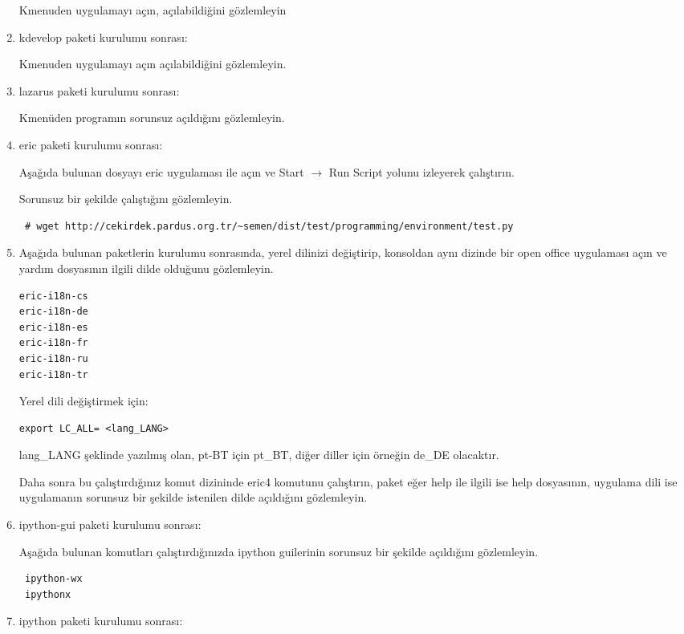 \documentclass[a4paper,10pt]{article}
\begin{document}
\begin{enumerate}
Kmenuden uygulamayı açın, açılabildiğini gözlemleyin

 \item kdevelop paketi kurulumu sonrası: 

Kmenuden uygulamayı açın açılabildiğini gözlemleyin.

 \item lazarus paketi kurulumu sonrası:

Kmenüden programın sorunsuz açıldığını gözlemleyin.

 \item eric paketi kurulumu sonrası:
 
Aşağıda bulunan dosyayı eric uygulaması ile açın ve Start $\rightarrow$ Run Script yolunu izleyerek çalıştırın. 

Sorunsuz bir şekilde çalıştığını gözlemleyin.
\begin{verbatim}
 # wget http://cekirdek.pardus.org.tr/~semen/dist/test/programming/environment/test.py
\end{verbatim}
 \item Aşağıda bulunan paketlerin kurulumu sonrasında, yerel dilinizi değiştirip, konsoldan aynı dizinde bir open office uygulaması açın ve yardım dosyasının ilgili dilde olduğunu gözlemleyin.
\begin{verbatim}
eric-i18n-cs
eric-i18n-de
eric-i18n-es
eric-i18n-fr
eric-i18n-ru
eric-i18n-tr
 \end{verbatim}

Yerel dili değiştirmek için:
\begin{verbatim}
export LC_ALL= <lang_LANG>
\end{verbatim}

lang\_LANG şeklinde yazılmış olan, pt-BT için pt\_BT, diğer diller için örneğin de\_DE olacaktır.

Daha sonra bu çalıştırdığınız komut dizininde eric4 komutunu çalıştırın, paket eğer help ile ilgili ise help dosyasının, uygulama dili ise uygulamanın sorunsuz bir şekilde istenilen dilde açıldığını gözlemleyin.

\item ipython-gui paketi kurulumu sonrası:

Aşağıda bulunan komutları çalıştırdığınızda ipython guilerinin sorunsuz bir şekilde açıldığını gözlemleyin.
\begin{verbatim}
 ipython-wx
 ipythonx
\end{verbatim}


\item ipython paketi kurulumu sonrası: 


\end{enumerate}
\end{document}
